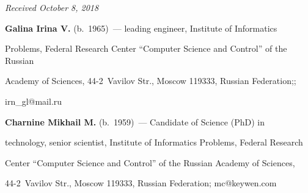 \vspace*{-3pt}





\hfill{\small\textit{Received October 8, 2018}} 


  


  


  \Contr


  


  \noindent


  \textbf{Galina Irina V.} (b.\ 1965)~--- leading engineer, Institute of Informatics 


Problems, Federal Research Center ``Computer Science and Control'' of the Russian 


Academy of Sciences, 44-2~Vavilov Str., Moscow 119333, Russian Federation;; 


\mbox{irn\_gl@mail.ru}  


  


  \vspace*{3pt}


  


  \noindent


  \textbf{Charnine Mikhail M.} (b.\ 1959)~--- Candidate of Science (PhD) in 


technology, senior scientist, Institute of Informatics Problems, Federal Research 


Center ``Computer Science and Control'' of the Russian Academy of Sciences,  


44-2~Vavilov Str., Moscow 119333, Russian Federation; \mbox{mc@keywen.com} 





\label{end\stat}








\renewcommand{\bibname}{\protect\rm Литература}


